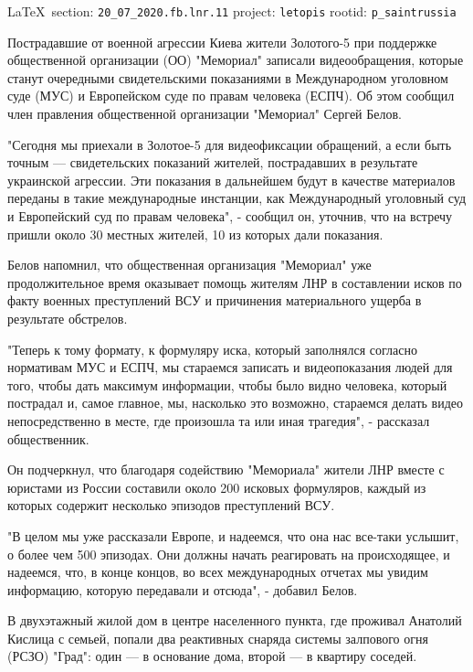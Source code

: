 \documentclass[a4paper,11pt]{extreport}
\begin{document}
\vspace{0.5cm}
{\small\LaTeX~section: \verb|20_07_2020.fb.lnr.11| project: \verb|letopis| rootid: \verb|p_saintrussia|}
\vspace{0.5cm}

Пострадавшие от военной агрессии Киева жители Золотого-5 при поддержке
общественной организации (ОО) "Мемориал" записали видеообращения, которые
станут очередными свидетельскими показаниями в Международном уголовном суде
(МУС) и Европейском суде по правам человека (ЕСПЧ). Об этом сообщил член
правления общественной организации "Мемориал" Сергей Белов. 

"Сегодня мы приехали в Золотое-5 для видеофиксации обращений, а если быть
точным --- свидетельских показаний жителей, пострадавших в результате украинской
агрессии. Эти показания в дальнейшем будут в качестве материалов переданы в
такие международные инстанции, как Международный уголовный суд и Европейский
суд по правам человека", - сообщил он, уточнив, что на встречу пришли около 30
местных жителей, 10 из которых дали показания. 

Белов напомнил, что общественная организация "Мемориал" уже продолжительное
время оказывает помощь жителям ЛНР в составлении исков по факту военных
преступлений ВСУ и причинения материального ущерба в результате обстрелов. 

"Теперь к тому формату, к формуляру иска, который заполнялся согласно
нормативам МУС и ЕСПЧ, мы стараемся записать и видеопоказания людей для того,
чтобы дать максимум информации, чтобы было видно человека, который пострадал и,
самое главное, мы, насколько это возможно, стараемся делать видео
непосредственно в месте, где произошла та или иная трагедия", - рассказал
общественник. 

Он подчеркнул, что благодаря содействию "Мемориала" жители ЛНР вместе с
юристами из России составили около 200 исковых формуляров, каждый из которых
содержит несколько эпизодов преступлений ВСУ. 

"В целом мы уже рассказали Европе, и надеемся, что она нас все-таки услышит, о
более чем 500 эпизодах. Они должны начать реагировать на происходящее, и
надеемся, что, в конце концов, во всех международных отчетах мы увидим
информацию, которую передавали и отсюда", - добавил Белов. 

В двухэтажный жилой дом в центре населенного пункта, где проживал Анатолий
Кислица с семьей, попали два реактивных снаряда системы залпового огня (РСЗО)
"Град": один --- в основание дома, второй --- в квартиру соседей. 
\end{document}

